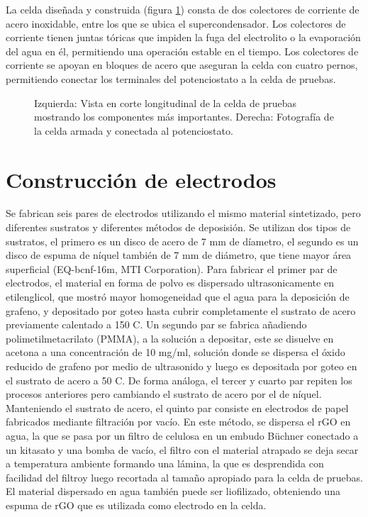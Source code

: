 La celda diseñada y construida (figura \ref{fig:celda_de_pruebas_SC}) consta de dos colectores de corriente de acero inoxidable, entre los que se ubica el supercondensador. Los colectores de corriente tienen juntas tóricas que impiden la fuga del electrolito o la evaporación del agua en él, permitiendo una operación estable en el tiempo. Los colectores de corriente se apoyan en bloques de acero que aseguran la celda con cuatro pernos, permitiendo conectar los terminales del potenciostato a la celda de pruebas.

\begin{figure}[h!]
	\centering
	\caption[Celda de pruebas de supercondensador.]{Izquierda: Vista en corte longitudinal de la celda de pruebas mostrando los componentes más importantes. Derecha: Fotografía de la celda armada y conectada al potenciostato.}
	\label{fig:celda_de_pruebas_SC}
\end{figure}

\section{Construcción de electrodos}
Se fabrican seis pares de electrodos utilizando el mismo material sintetizado, pero diferentes sustratos y diferentes métodos de deposisión. Se utilizan dos tipos de sustratos, el primero es un disco de acero de 7 mm de díametro, el segundo es un disco de espuma de níquel también de 7 mm de diámetro, que tiene mayor área superficial (EQ-bcnf-16m, MTI Corporation). Para fabricar el primer par de electrodos, el material en forma de polvo es dispersado ultrasonicamente en etilenglicol, que mostró mayor homogeneidad que el agua para la deposición de grafeno, y depositado por goteo hasta cubrir completamente el sustrato de acero previamente calentado a 150 \degree C. Un segundo par se fabrica añadiendo polimetilmetacrilato (PMMA), a la solución a depositar, este se disuelve en acetona a una concentración de 10 mg/ml, solución donde se dispersa el óxido reducido de grafeno por medio de ultrasonido y luego es depositada por goteo en el sustrato de acero a 50 \degree C. De forma análoga, el tercer y cuarto par repiten los procesos anteriores pero cambiando el sustrato de acero por el de níquel. Manteniendo el sustrato de acero, el quinto par consiste en electrodos de papel fabricados mediante filtración por vacío. En este método, se dispersa el rGO en agua, la que se pasa por un filtro de celulosa en un embudo Büchner conectado a un kitasato y una bomba de vacío, el filtro con el material atrapado se deja secar a temperatura ambiente formando una lámina, la que es desprendida con facilidad del filtroy luego recortada al tamaño apropiado para la celda de pruebas. El material dispersado en agua también puede ser liofilizado, obteniendo una espuma de rGO que es utilizada como electrodo en la celda.

